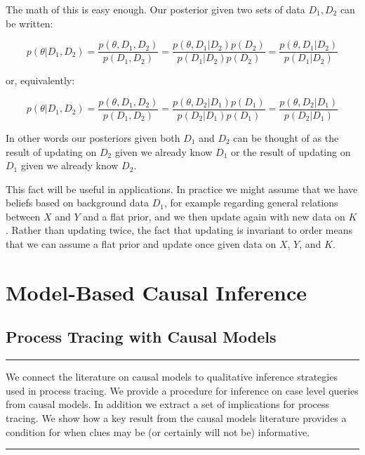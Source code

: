 \documentclass[12pt,]{book}
\begin{document}
The math of this is easy enough. Our posterior given two sets of data \(D_1, D_2\) can be written:

\[p(\theta | D_1, D_2) = \frac{p(\theta, D_1, D_2)}{p(D_1, D_2)} = \frac{p(\theta, D_1 | D_2)p(D_2)}{p(D_1 | D_2)p(D_2)}= \frac{p(\theta, D_1 | D_2)}{p(D_1 | D_2)}\]

or, equivalently:

\[p(\theta | D_1, D_2) = \frac{p(\theta, D_1, D_2)}{p(D_1, D_2)} = \frac{p(\theta, D_2 | D_1)p(D_1)}{p(D_2 | D_1)p(D_1)}= \frac{p(\theta, D_2 | D_1)}{p(D_2 | D_1)}\]

In other words our posteriors given both \(D_1\) and \(D_2\) can be thought of as the result of updating on \(D_2\) given we already know \(D_1\) or the result of updating on \(D_1\) given we already know \(D_2\).

This fact will be useful in applications. In practice we might assume that we have beliefs based on background data \(D_1\), for example regarding general relations between \(X\) and \(Y\) and a flat prior, and we then update again with new data on \(K\). Rather than updating twice, the fact that updating is invariant to order means that we can assume a flat prior and update once given data on \(X\), \(Y\), and \(K\).

\hypertarget{part-model-based-causal-inference}{%
\part{Model-Based Causal Inference}\label{part-model-based-causal-inference}}

\hypertarget{pt}{%
\chapter{Process Tracing with Causal Models}\label{pt}}

\begin{center}\rule{0.5\linewidth}{\linethickness}\end{center}

We connect the literature on causal models to qualitative inference strategies used in process tracing. We provide a procedure for inference on case level queries from causal models. In addition we extract a set of implications for process tracing. We show how a key result from the causal models literature provides a condition for when clues may be (or certainly will not be) informative.

\begin{center}\rule{0.5\linewidth}{\linethickness}\end{center}
\end{document}
